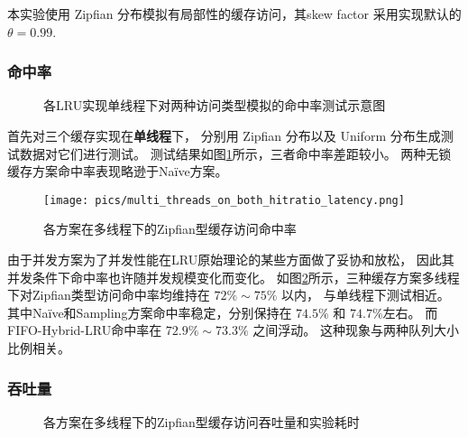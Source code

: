 本实验使用 Zipfian 分布模拟有局部性的缓存访问，其skew factor 采用实现默认的$\theta = 0.99$\cite{dirtyzipf2024}.

\subsubsection{命中率}

\begin{figure}
    \caption{各LRU实现单线程下对两种访问类型模拟的命中率测试示意图}
    \label{fig:dist_on_3_1thread}
\end{figure}

首先对三个缓存实现在\textbf{单线程}下，
分别用 Zipfian 分布以及 Uniform 分布生成测试数据对它们进行测试。
测试结果如图\ref{fig:dist_on_3_1thread}所示，三者命中率差距较小。
两种无锁缓存方案命中率表现略逊于Na\"{i}ve方案。

\begin{figure}
    \centering
    \texttt{[image: pics/multi\_threads\_on\_both\_hitratio\_latency.png]}
    \caption{各方案在多线程下的Zipfian型缓存访问命中率}
    \label{fig:dist_multithread}
\end{figure}

由于并发方案为了并发性能在LRU原始理论的某些方面做了妥协和放松，
因此其并发条件下命中率也许随并发规模变化而变化。
如图\ref{fig:dist_multithread}所示，三种缓存方案多线程下对Zipfian类型访问命中率均维持在 $72\% \sim 75\%$ 以内，
与单线程下测试相近。
其中Na\"{i}ve和Sampling方案命中率稳定，分别保持在 $74.5\%$ 和 $74.7\%$左右。
而FIFO-Hybrid-LRU命中率在 $72.9\% \sim 73.3\%$ 之间浮动。
这种现象与两种队列大小比例相关。

\subsubsection{吞吐量}

\begin{figure}
    \centering
    \caption{各方案在多线程下的Zipfian型缓存访问吞吐量和实验耗时}
    \label{fig:throughput}
\end{figure}

